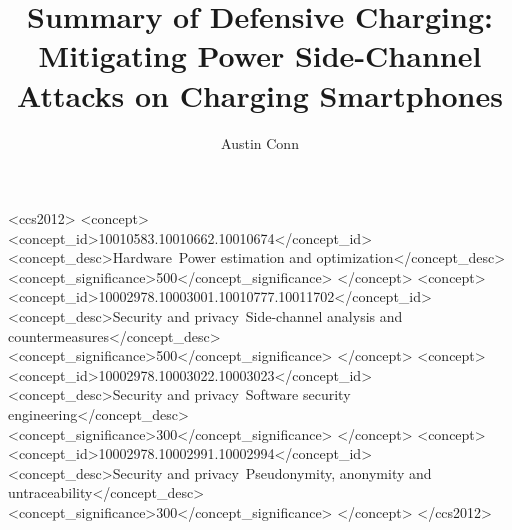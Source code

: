 \documentclass[sigconf]{acmart}
\def\papertitle{Defensive Charging: Mitigating Power Side-Channel Attacks on Charging Smartphones}
\begin{document}
\title{Summary of \papertitle}


\author{Austin Conn}

\renewcommand{\shortauthors}{A. Conn}




%
%
\begin{CCSXML}
  <ccs2012>
    <concept>
      <concept_id>10010583.10010662.10010674</concept_id>
      <concept_desc>Hardware~Power estimation and optimization</concept_desc>
      <concept_significance>500</concept_significance>
    </concept>
    <concept>
      <concept_id>10002978.10003001.10010777.10011702</concept_id>
      <concept_desc>Security and privacy~Side-channel analysis and countermeasures</concept_desc>
      <concept_significance>500</concept_significance>
    </concept>
    <concept>
      <concept_id>10002978.10003022.10003023</concept_id>
      <concept_desc>Security and privacy~Software security engineering</concept_desc>
      <concept_significance>300</concept_significance>
    </concept>
    <concept>
      <concept_id>10002978.10002991.10002994</concept_id>
      <concept_desc>Security and privacy~Pseudonymity, anonymity and untraceability</concept_desc>
      <concept_significance>300</concept_significance>
    </concept>
  </ccs2012>
\end{CCSXML}




\maketitle







 
% 

\newpage
\end{document}

